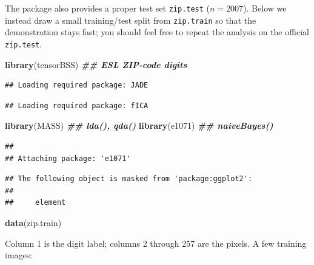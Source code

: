 \documentclass[
]{book}
\newenvironment{Shaded}{\begin{snugshade}}{\end{snugshade}}
\newcommand{\DocumentationTok}[1]{\textcolor[rgb]{0.56,0.35,0.01}{\textbf{\textit{#1}}}}
\newcommand{\FunctionTok}[1]{\textcolor[rgb]{0.13,0.29,0.53}{\textbf{#1}}}
\newcommand{\NormalTok}[1]{#1}
\begin{document}
The package also provides a proper test set \texttt{zip.test} (\(n = 2007\)). Below we instead draw a small training/test split from \texttt{zip.train} so that the demonstration stays fast; you should feel free to repeat the analysis on the official \texttt{zip.test}.

\begin{Shaded}
\begin{Highlighting}[]
\FunctionTok{library}\NormalTok{(tensorBSS)  }\DocumentationTok{\#\# ESL ZIP{-}code digits}
\end{Highlighting}
\end{Shaded}

\begin{verbatim}
## Loading required package: JADE
\end{verbatim}

\begin{verbatim}
## Loading required package: fICA
\end{verbatim}

\begin{Shaded}
\begin{Highlighting}[]
\FunctionTok{library}\NormalTok{(MASS)  }\DocumentationTok{\#\# lda(), qda()}
\FunctionTok{library}\NormalTok{(e1071)  }\DocumentationTok{\#\# naiveBayes()}
\end{Highlighting}
\end{Shaded}

\begin{verbatim}
## 
## Attaching package: 'e1071'
\end{verbatim}

\begin{verbatim}
## The following object is masked from 'package:ggplot2':
## 
##     element
\end{verbatim}

\begin{Shaded}
\begin{Highlighting}[]
\FunctionTok{data}\NormalTok{(zip.train)}
\end{Highlighting}
\end{Shaded}

Column 1 is the digit label; columns 2 through 257 are the pixels. A few training images:
\end{document}
